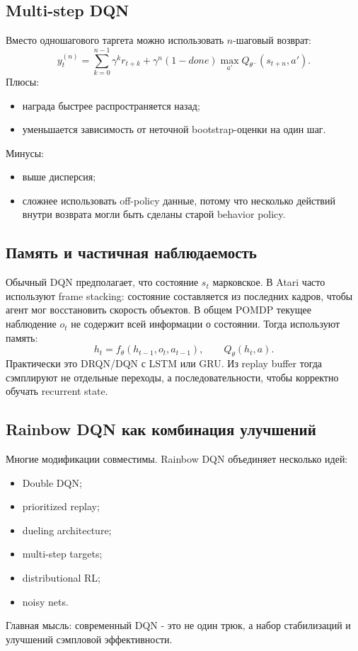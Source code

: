 \documentclass[11pt,a4paper]{article}
\newcommand{\1}{\mathbf{1}}
\begin{document}
\subsection*{Multi-step DQN}
Вместо одношагового таргета можно использовать $n$-шаговый возврат:
\[
    y_t^{(n)}=\sum_{k=0}^{n-1}\gamma^k r_{t+k}
    +\gamma^n(1-done)\max_{a'}Q_{\theta^-}(s_{t+n},a').
\]
Плюсы:
\begin{itemize}
    \item награда быстрее распространяется назад;
    \item уменьшается зависимость от неточной bootstrap-оценки на один шаг.
\end{itemize}
Минусы:
\begin{itemize}
    \item выше дисперсия;
    \item сложнее использовать off-policy данные, потому что несколько действий внутри возврата могли быть сделаны старой behavior policy.
\end{itemize}

\subsection*{Память и частичная наблюдаемость}
Обычный DQN предполагает, что состояние $s_t$ марковское. В Atari часто используют frame stacking: состояние составляется из последних кадров, чтобы агент мог восстановить скорость объектов. В общем POMDP текущее наблюдение $o_t$ не содержит всей информации о состоянии. Тогда используют память:
\[
    h_t=f_\theta(h_{t-1},o_t,a_{t-1}),
    \qquad
    Q_\theta(h_t,a).
\]
Практически это DRQN/DQN с LSTM или GRU. Из replay buffer тогда сэмплируют не отдельные переходы, а последовательности, чтобы корректно обучать recurrent state.

\subsection*{Rainbow DQN как комбинация улучшений}
Многие модификации совместимы. Rainbow DQN объединяет несколько идей:
\begin{itemize}
    \item Double DQN;
    \item prioritized replay;
    \item dueling architecture;
    \item multi-step targets;
    \item distributional RL;
    \item noisy nets.
\end{itemize}
Главная мысль: современный DQN - это не один трюк, а набор стабилизаций и улучшений сэмпловой эффективности.
\end{document}
